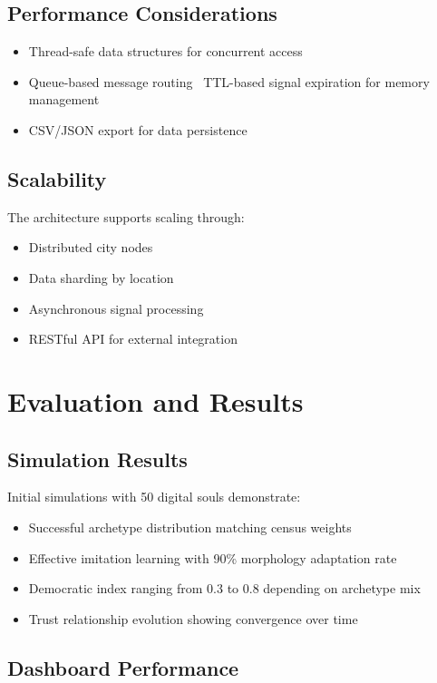 \documentclass[12pt,a4paper]{article}
\begin{document}
\begin{itemize}
\subsection{Performance Considerations}

\begin{itemize}
    \item Thread-safe data structures for concurrent access
    \item Queue-based message routing
    \ TTL-based signal expiration for memory management
    \item CSV/JSON export for data persistence
\end{itemize}

\subsection{Scalability}

The architecture supports scaling through:
\begin{itemize}
    \item Distributed city nodes
    \item Data sharding by location
    \item Asynchronous signal processing
    \item RESTful API for external integration
\end{itemize}

\section{Evaluation and Results}

\subsection{Simulation Results}

Initial simulations with 50 digital souls demonstrate:
\begin{itemize}
    \item Successful archetype distribution matching census weights
    \item Effective imitation learning with 90\% morphology adaptation rate
    \item Democratic index ranging from 0.3 to 0.8 depending on archetype mix
    \item Trust relationship evolution showing convergence over time
\end{itemize}

\subsection{Dashboard Performance}


\end{itemize}
\end{document}
